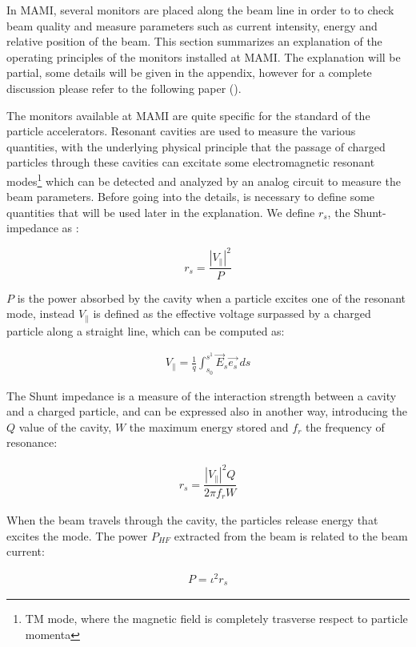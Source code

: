 In MAMI, several monitors are placed along the beam line in order to to check beam quality and measure parameters such as current intensity, energy and relative position of the beam. This section summarizes an explanation of the operating principles of the monitors installed at MAMI. The explanation will be partial, some details will be given in the appendix, however for a complete discussion please refer to the following paper (\cite{M_Dehn}).

The monitors available at MAMI are quite specific for the standard of the particle accelerators. Resonant cavities are used to measure the various quantities, with the underlying physical principle that the passage of charged particles through these cavities can excitate some electromagnetic resonant modes\footnote{TM mode, where the magnetic field is completely trasverse respect to particle momenta} which can be detected and analyzed by an analog circuit to measure the beam parameters.
Before going into the details, is necessary to define some quantities that will be used later in the explanation. We define $r_{s}$, the Shunt-impedance as :

\begin{equation}
r_{s} = \frac{|V_{\|}|^{2}}{P}
\end{equation}

$P$ is the power absorbed by the cavity when a particle excites one of the resonant mode, instead $V_{\|}$ is defined as the effective voltage surpassed by a charged particle along a straight line, which can be computed as:

\begin{align*}
V_{\|} = \frac{1}{q}  \int_{s_{0}}^{s^{1}} \vec{E}_{s} \vec{e_{s}} \,ds
\end{align*}

The Shunt impedance is a measure of the interaction strength between a cavity and a charged particle, and can be expressed also in another way, introducing the $Q$ value of the cavity, $W$ the maximum energy stored and $f_{r}$ the frequency of resonance:

\begin{align*}
r_{s} = \dfrac{|V_{\|}|^{2} Q}{2 \pi f_{r} W}
\end{align*}

When the beam travels through the cavity, the particles release energy that excites the  mode. The power $P_{HF}$ extracted from the beam is related to the beam current: 

\begin{align*}
P = \iota^{2} r_{s}
\end{align*}

